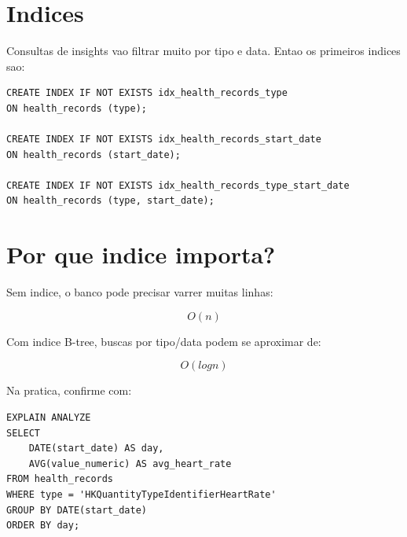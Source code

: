 \section{Indices}

Consultas de insights vao filtrar muito por tipo e data. Entao os primeiros indices sao:

\begin{lstlisting}[style=devbuttersql]
CREATE INDEX IF NOT EXISTS idx_health_records_type
ON health_records (type);

CREATE INDEX IF NOT EXISTS idx_health_records_start_date
ON health_records (start_date);

CREATE INDEX IF NOT EXISTS idx_health_records_type_start_date
ON health_records (type, start_date);
\end{lstlisting}

\section{Por que indice importa?}

Sem indice, o banco pode precisar varrer muitas linhas:

\[
O(n)
\]

Com indice B-tree, buscas por tipo/data podem se aproximar de:

\[
O(log n)
\]

Na pratica, confirme com:

\begin{lstlisting}[style=devbuttersql]
EXPLAIN ANALYZE
SELECT
    DATE(start_date) AS day,
    AVG(value_numeric) AS avg_heart_rate
FROM health_records
WHERE type = 'HKQuantityTypeIdentifierHeartRate'
GROUP BY DATE(start_date)
ORDER BY day;
\end{lstlisting}
